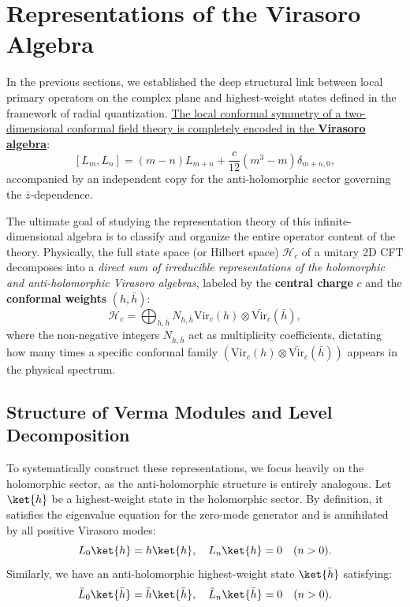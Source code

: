 \section{Representations of the Virasoro Algebra}

In the previous sections, we established the deep structural link between local primary operators on the complex plane and highest-weight states defined in the framework of radial quantization. \uline{The local conformal symmetry of a two-dimensional conformal field theory is completely encoded in the \textbf{Virasoro algebra}}:
\[
    [L_m, L_n] = (m - n)L_{m+n} + \frac{c}{12}(m^3 - m)\delta_{m+n,0},
\]
accompanied by an independent copy for the anti-holomorphic sector governing the \(\bar{z}\)-dependence.

The ultimate goal of studying the representation theory of this infinite-dimensional algebra is to classify and organize the entire operator content of the theory. Physically, the full state space (or Hilbert space) \(\mathcal{H}_c\) of a unitary 2D CFT decomposes into a \textit{direct sum of irreducible representations of the holomorphic and anti-holomorphic Virasoro algebras}, labeled by the \textbf{central charge} \(c\) and the \textbf{conformal weights} \((h, \bar{h})\):
\[
    \mathcal{H}_c = \bigoplus_{h, \bar{h}} N_{h, \bar{h}} \mathrm{Vir}_c(h) \otimes \bar{\mathrm{Vir}}_{c}(\bar{h}),
\]
where the non-negative integers \(N_{h, \bar{h}}\) act as multiplicity coefficients, dictating how many times a specific conformal family \((\mathrm{Vir}_c(h) \otimes \bar{\mathrm{Vir}}_{c}(\bar{h}))\) appears in the physical spectrum.

\subsection{Structure of Verma Modules and Level Decomposition}

To systematically construct these representations, we focus heavily on the holomorphic sector, as the anti-holomorphic structure is entirely analogous. Let \(\ket{h}\) be a highest-weight state in the holomorphic sector. By definition, it satisfies the eigenvalue equation for the zero-mode generator and is annihilated by all positive Virasoro modes:
\[
    L_0\ket{h} = h\ket{h}, \quad L_n\ket{h} = 0 \quad (n > 0).
\]
Similarly, we have an anti-holomorphic highest-weight state \(\ket{\bar{h}}\) satisfying:
\[
    \bar{L}_0\ket{\bar{h}} = \bar{h}\ket{\bar{h}}, \quad \bar{L}_n\ket{\bar{h}} = 0 \quad (n > 0).
\]

